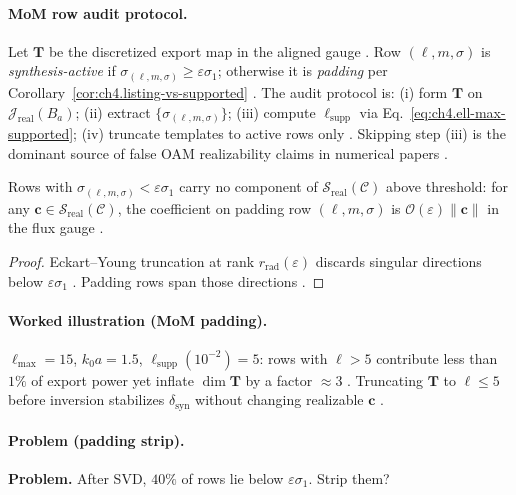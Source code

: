 \paragraph{MoM row audit protocol.}
Let \(\mathbf{T}\) be the discretized export map in the aligned gauge \cite{harrington2001}. Row \( (\ell,m,\sigma)\) is \emph{synthesis-active}
if \(\sigma_{(\ell,m,\sigma)}\ge\varepsilon\sigma_{1}\); otherwise it is \emph{padding} per Corollary~\ref{cor:ch4.listing-vs-supported}
\cite{hansen1988,devaney2004}. The audit protocol is: (i) form \(\mathbf{T}\) on \(\mathcal{J}_{\mathrm{real}}(B_{a})\); (ii) extract
\(\{\sigma_{(\ell,m,\sigma)}\}\); (iii) compute \(\ell_{\mathrm{supp}}\) via Eq.~\eqref{eq:ch4.ell-max-supported}; (iv) truncate templates to
active rows only \cite{stratton1941,harrington2001}. Skipping step (iii) is the dominant source of false OAM realizability claims in numerical
papers \cite{hansen1988,jackson1999}.

\begin{theorem}
\label{thm:ch4.padding-invisible}
Rows with \(\sigma_{(\ell,m,\sigma)}<\varepsilon\sigma_{1}\) carry no component of \(\mathcal{S}_{\mathrm{real}}(\mathcal{C})\) above
threshold: for any \(\mathbf{c}\in\mathcal{S}_{\mathrm{real}}(\mathcal{C})\), the coefficient on padding row \((\ell,m,\sigma)\) is
\(\mathcal{O}(\varepsilon)\|\mathbf{c}\|\) in the flux gauge \cite{harrington2001,devaney2004,stratton1941}.
\end{theorem}
\begin{proof}
Eckart--Young truncation at rank \(r_{\mathrm{rad}}(\varepsilon)\) discards singular directions below \(\varepsilon\sigma_{1}\)
\cite{harrington2001}. Padding rows span those directions \cite{hansen1988,stratton1941}.
\end{proof}

\paragraph{Worked illustration (MoM padding).}
\(\ell_{\max}=15\), \(k_{0}a=1.5\), \(\ell_{\mathrm{supp}}(10^{-2})=5\): rows with \(\ell>5\) contribute less than \(1\%\) of export power
yet inflate \(\dim\mathbf{T}\) by a factor \(\approx3\) \cite{hansen1988,harrington2001,devaney2004}. Truncating \(\mathbf{T}\) to
\(\ell\le5\) before inversion stabilizes \(\delta_{\mathrm{syn}}\) without changing realizable \(\mathbf{c}\) \cite{stratton1941}.

\paragraph{Problem (padding strip).}
\textbf{Problem.} After SVD, \(40\%\) of rows lie below \(\varepsilon\sigma_{1}\). Strip them?

